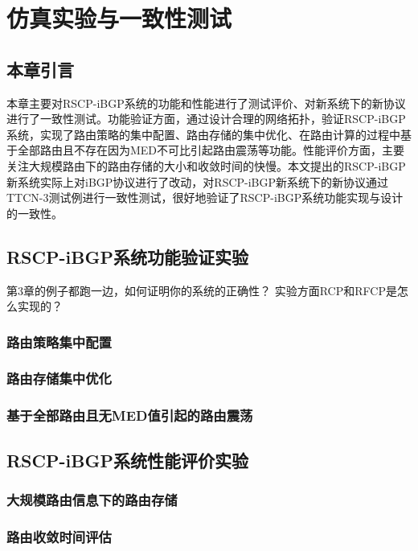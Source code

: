 \chapter{仿真实验与一致性测试}
\label{cha:evaluate}


\section{本章引言}
本章主要对RSCP-iBGP系统的功能和性能进行了测试评价、对新系统下的新协议进行了一致性测试。功能验证方面，通过设计合理的网络拓扑，验证RSCP-iBGP系统，实现了路由策略的集中配置、路由存储的集中优化、在路由计算的过程中基于全部路由且不存在因为MED不可比引起路由震荡等功能。性能评价方面，主要关注大规模路由下的路由存储的大小和收敛时间的快慢。本文提出的RSCP-iBGP新系统实际上对iBGP协议进行了改动，对RSCP-iBGP新系统下的新协议通过TTCN-3测试例进行一致性测试，很好地验证了RSCP-iBGP系统功能实现与设计的一致性。

\section{RSCP-iBGP系统功能验证实验}

第3章的例子都跑一边，如何证明你的系统的正确性？
实验方面RCP和RFCP是怎么实现的？

\subsection{路由策略集中配置}

\subsection{路由存储集中优化}

\subsection{基于全部路由且无MED值引起的路由震荡}


\section{RSCP-iBGP系统性能评价实验}

\subsection{大规模路由信息下的路由存储}

\subsection{路由收敛时间评估}



